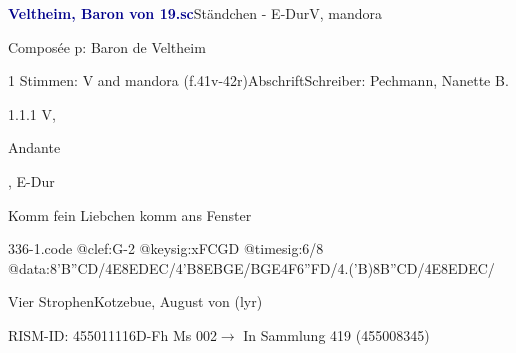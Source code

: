 \documentclass[twocolumn, 12pt]{book}
\begin{document}
\par \vspace{16pt} \textcolor{darkblue}{\textbf{Veltheim, Baron von  19.sc}}\hfillplus{\textbf{[336]}}\newline Ständchen - E-Dur\newline V, mandora
\par \begin{itshape}[heading, f.41v:] Composée p: Baron de Veltheim\end{itshape} 
\par \textcolor{darkblue}{}  1 Stimmen: V and mandora  (f.41v-42r)\newline Abschrift\newline Schreiber: Pechmann, Nanette B.
\par 1.1.1  V, \begin{itshape}Andante\end{itshape}, E-Dur\newline \begin{footnotesize} Komm fein Liebchen komm ans Fenster \end{footnotesize}  
\begin{filecontents*}{336-1.code}
@clef:G-2
@keysig:xFCGD
@timesig:6/8
@data:{8'B''C}D/4E8E{DE}C/4'B8E{BG}E/{BG}E4F{6''FD}/4.('B){8B''C}D/4E8E{DE}C/
\end{filecontents*}
\newline %
\par Vier Strophen\newline Kotzebue, August von  (lyr)
\par RISM-ID: 455011116\newline D-Fh  Ms 002\newline $\rightarrow$ In Sammlung 419 (455008345)
      
\end{document}
